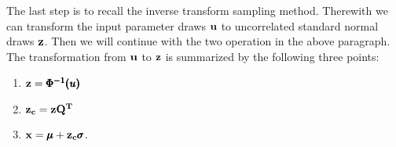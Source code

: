 \documentclass[a4paper,12pt]{article}
\begin{document}
\noindent
The last step is to recall the inverse transform sampling method. Therewith we can transform the input parameter draws $\bold{u}$ to uncorrelated standard normal draws $\bold{z}$. Then we will continue with the two operation in the above paragraph. The transformation from $\bold{u}$ to $\bold{z}$ is summarized by the following three points:


\centering\parbox{.35\textwidth}{
\begin{enumerate}
	\item $\bold{z} = \pmb{\Phi^{-1}({u})}$
	\item $\bold{z_c} = \bold{z Q^T}$
	\item $\bold{x} = \pmb{\mu} + \bold{z_c}\pmb{\sigma}$.
\end{enumerate}}












\newpage

\end{document}
